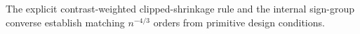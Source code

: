 The explicit contrast-weighted clipped-shrinkage rule and the internal sign-group converse establish matching \(n^{-4/3}\) orders from primitive design conditions.